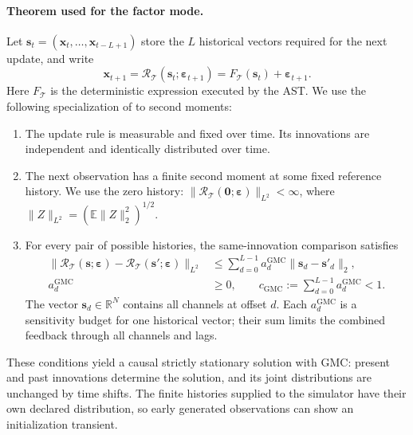 \paragraph{Theorem used for the factor mode.}
Let $\mathbf{s}_t=(\mathbf x_t,\ldots,\mathbf x_{t-L+1})$ store the $L$
historical vectors required for the next update, and write
\begin{equation}
 \mathbf x_{t+1}=\mathcal R_{\mathcal T}(\mathbf{s}_t;
                                      \boldsymbol\varepsilon_{t+1})
 =F_{\mathcal T}(\mathbf{s}_t)+\boldsymbol\varepsilon_{t+1}.
 \label{eq:implemented-gmc-recurrence}
\end{equation}
Here $F_{\mathcal T}$ is the deterministic expression executed by the AST.
We use the following specialization of
\citet[Theorem~5.1 and its proof, electronic reprint pp.~11--12]{shao2007spectral}
to second moments:
\begin{enumerate}
\item The update rule is measurable and fixed over time. Its innovations
are independent and identically distributed over time.
\item The next observation has a finite second moment at some fixed
reference history. We use the zero history:
$\|\mathcal R_{\mathcal T}(\mathbf0;\boldsymbol\varepsilon)\|_{L^2}<\infty$,
where $\|Z\|_{L^2}=(\mathbb E\|Z\|_2^2)^{1/2}$.
\item For every pair of possible histories, the same-innovation comparison
satisfies
\begin{equation}
\begin{split}
 \|\mathcal R_{\mathcal T}(\mathbf{s};\boldsymbol\varepsilon)
      -\mathcal R_{\mathcal T}(\mathbf{s}';\boldsymbol\varepsilon)\|_{L^2}
 &\leq\sum_{d=0}^{L-1}a_d^{\mathrm{GMC}}
                       \|\mathbf{s}_d-\mathbf{s}'_d\|_2,\\
 a_d^{\mathrm{GMC}}&\geq0,\qquad
 c_{\mathrm{GMC}}:=\sum_{d=0}^{L-1}a_d^{\mathrm{GMC}}<1.
\end{split}
\label{eq:implemented-gmc-condition}
\end{equation}
The vector $\mathbf{s}_d\in\mathbb R^N$ contains all channels at offset $d$.
Each $a_d^{\mathrm{GMC}}$ is a sensitivity budget for one historical vector;
their sum limits the combined feedback through all channels and lags.
\end{enumerate}
These conditions yield a causal strictly stationary solution with GMC:
present and past innovations determine the solution, and its joint
distributions are unchanged by time shifts. The finite histories supplied
to the simulator have their own declared distribution, so early generated
observations can show an initialization transient.

